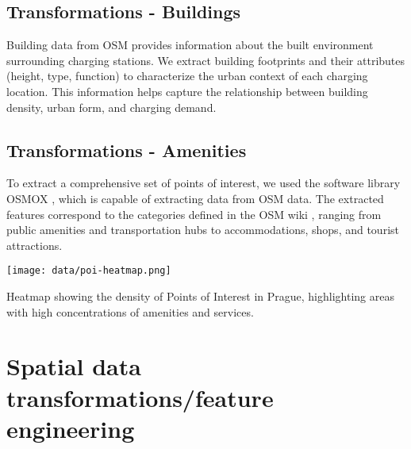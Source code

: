 \subsection{Transformations - Buildings}

Building data from OSM provides information about the built environment surrounding charging stations. We extract building footprints and their attributes (height, type, function) to characterize the urban context of each charging location. This information helps capture the relationship between building density, urban form, and charging demand.

\subsection{Transformations - Amenities}

To extract a comprehensive set of points of interest, we used the software library OSMOX , which is capable of extracting data from \acrshort{OSM} data. The extracted features correspond to the categories defined in the OSM wiki , ranging from public amenities and transportation hubs to accommodations, shops, and tourist attractions.

\begin{marginfigure}
    \texttt{[image: data/poi-heatmap.png]}
    \caption{Heatmap showing the density of Points of Interest in Prague, highlighting areas with high concentrations of amenities and services.}
\end{marginfigure}




\section{Spatial data transformations/feature engineering}
\label{sec:spatial-transformations}

